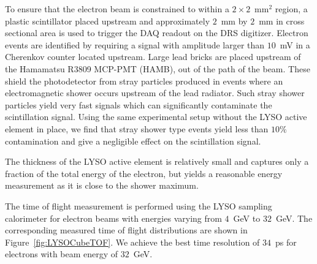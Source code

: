 \documentclass[12pt]{article}
\begin{document}
To ensure that the electron beam is constrained to within a $2\times 2$~mm$^2$ region, 
a plastic scintillator placed upstream and approximately $2$~mm by $2$~mm in cross sectional 
area is used to trigger the DAQ readout on the DRS  digitizer. Electron events are identified 
by requiring a signal with amplitude larger than $10$~mV in a Cherenkov counter located 
upstream. Large lead bricks are placed upstream of the Hamamatsu R3809 MCP-PMT (HAMB),
out of the path of the beam. These shield the photodetector from stray particles
produced in events where an electromagnetic shower occurs upstream of the lead
radiator. Such stray shower particles yield very fast signals which can
significantly contaminate the scintillation signal. Using the same experimental
setup without the LYSO active element in place, we find that stray shower type
events yield less than $10\%$ contamination and give a negligible effect on the
scintillation signal. 


The thickness of the LYSO active element is relatively small and captures only a fraction 
of the total energy of the electron, but yields a reasonable energy measurement
as it is close to the shower maximum.

The time of flight measurement is performed using the LYSO sampling calorimeter
for electron beams with energies varying from $4$~GeV to $32$~GeV. The corresponding 
measured time of flight distributions are shown in Figure~\ref{fig:LYSOCubeTOF}.
We achieve the best time resolution of $34$~ps for electrons
with beam energy of $32$~GeV.
\end{document}
